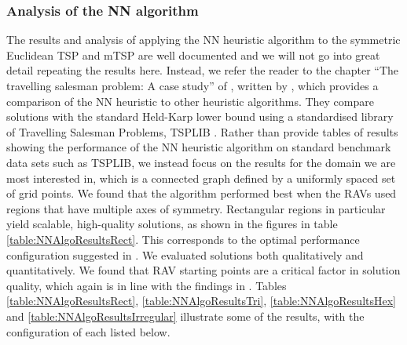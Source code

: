 


\subsubsection{Analysis of the NN algorithm}


The results and analysis of applying the NN heuristic algorithm to the symmetric Euclidean TSP and mTSP are well documented and we will not go into great detail repeating the results here. Instead, we refer the reader to the chapter ``The travelling salesman problem: A case study'' of \cite{Aarts:1997:LSC:549160}, written by \citeauthor{Johnson1995TheOptimization}, which provides a comparison of the NN heuristic to other heuristic algorithms. They compare solutions with the standard Held-Karp lower bound \cite{Held1962AProblems} using a standardised library of Travelling Salesman Problems, TSPLIB \cite{TSPLIB}. Rather than provide tables of results showing the performance of the NN heuristic algorithm on standard benchmark data sets such as TSPLIB, we instead focus on the results for the domain we are most interested in, which is a connected graph defined by a uniformly spaced set of grid points. We found that the algorithm performed best when the RAVs used regions that have multiple axes of symmetry. Rectangular regions in particular yield scalable, high-quality solutions, as shown in the figures in table \ref{table:NNAlgoResultsRect}. This corresponds to the optimal performance configuration suggested in \cite{Hungerlander2018TheGrids}. We evaluated solutions both qualitatively and  quantitatively. We found that RAV starting points are a critical factor in solution quality, which again is in line with the findings in \cite{Hungerlander2018TheGrids}. Tables \ref{table:NNAlgoResultsRect}, \ref{table:NNAlgoResultsTri}, \ref{table:NNAlgoResultsHex} and \ref{table:NNAlgoResultsIrregular} illustrate some of the results, with the configuration of each listed below.\\

